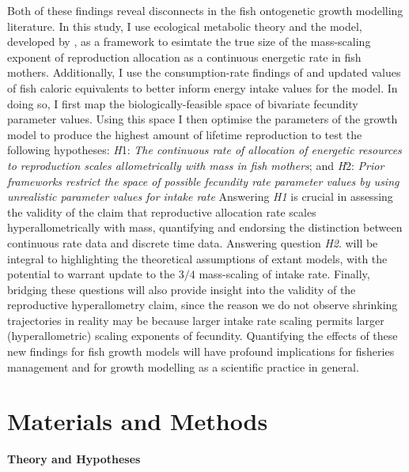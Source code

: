 \documentclass[a4paper]{article} %
\begin{document}
    Both of these findings reveal disconnects in the fish ontogenetic growth modelling literature. In this study, I use ecological metabolic theory and the \cite{West2001} model, developed by \cite{Charnov2001}, as a framework to esimtate the true size of the mass-scaling exponent of reproduction allocation as a continuous energetic rate in fish mothers. Additionally, I use the consumption-rate findings of \cite{Pawar2012} and updated values of fish caloric equivalents to better inform energy intake values for the model. In doing so, I first map the biologically-feasible space of bivariate fecundity parameter values. Using this space I then optimise the parameters of the growth model to produce the highest amount of lifetime reproduction to test the following hypotheses: \textit{H}1: \textit{The continuous rate of allocation of energetic resources to reproduction scales allometrically with mass in fish mothers}; and \textit{H}2: \textit{Prior frameworks restrict the space of possible fecundity rate parameter values by using unrealistic parameter values for intake rate}
    Answering \textit{H1} is crucial in assessing the validity of the claim that reproductive allocation rate scales hyperallometrically with mass, quantifying and endorsing the distinction between continuous rate data and discrete time data. Answering question \textit{H2}. will be integral to highlighting the theoretical assumptions of extant models, with the potential to warrant update to the $3/4$ mass-scaling of intake rate. Finally, bridging these questions will also provide insight into the validity of the reproductive hyperallometry claim, since the reason we do not observe shrinking trajectories in reality may be because larger intake rate scaling permits larger (hyperallometric) scaling exponents of fecundity. Quantifying the effects of these new findings for fish growth models will have profound implications for fisheries management and for growth modelling as a scientific practice in general.

\section{Materials and Methods}\thispagestyle{plain}
\textbf{Theory and Hypotheses}
\end{document}
